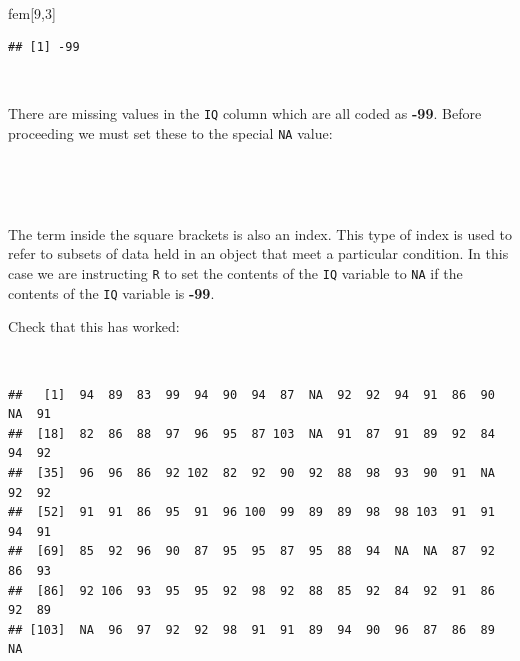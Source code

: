 \documentclass[12pt,a4paper]{book}
\newenvironment{Shaded}{\begin{snugshade}}{\end{snugshade}}
\newcommand{\DecValTok}[1]{\textcolor[rgb]{0.00,0.00,0.81}{#1}}
\newcommand{\NormalTok}[1]{#1}
\newcommand{\OperatorTok}[1]{\textcolor[rgb]{0.81,0.36,0.00}{\textbf{#1}}}
\newcommand{\OtherTok}[1]{\textcolor[rgb]{0.56,0.35,0.01}{#1}}
\newcommand{\StringTok}[1]{\textcolor[rgb]{0.31,0.60,0.02}{#1}}
\theoremstyle{definition}
\theoremstyle{definition}
\theoremstyle{definition}
\theoremstyle{remark}
\begin{document}
~

\begin{Shaded}
\begin{Highlighting}[]
\NormalTok{fem[}\DecValTok{9}\NormalTok{,}\DecValTok{3}\NormalTok{]}
\end{Highlighting}
\end{Shaded}

\begin{verbatim}
## [1] -99
\end{verbatim}

~

There are missing values in the \texttt{IQ} column which are all coded
as \textbf{-99}. Before proceeding we must set these to the special
\texttt{NA} value:

~

\begin{Shaded}
\end{Shaded}

~

The term inside the square brackets is also an index. This type of index
is used to refer to subsets of data held in an object that meet a
particular condition. In this case we are instructing \texttt{R} to set
the contents of the \texttt{IQ} variable to \texttt{NA} if the contents
of the \texttt{IQ} variable is \textbf{-99}.

\newpage

Check that this has worked:

~

\begin{Shaded}
\end{Shaded}

\begin{verbatim}
##   [1]  94  89  83  99  94  90  94  87  NA  92  92  94  91  86  90  NA  91
##  [18]  82  86  88  97  96  95  87 103  NA  91  87  91  89  92  84  94  92
##  [35]  96  96  86  92 102  82  92  90  92  88  98  93  90  91  NA  92  92
##  [52]  91  91  86  95  91  96 100  99  89  89  98  98 103  91  91  94  91
##  [69]  85  92  96  90  87  95  95  87  95  88  94  NA  NA  87  92  86  93
##  [86]  92 106  93  95  95  92  98  92  88  85  92  84  92  91  86  92  89
## [103]  NA  96  97  92  92  98  91  91  89  94  90  96  87  86  89  NA
\end{verbatim}
\end{document}
